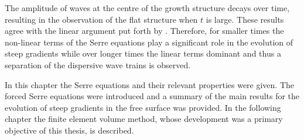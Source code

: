 The amplitude of waves at the centre of the growth structure decays over time, resulting in the observation of the flat structure when $t$ is large. These results agree with the linear argument put forth by \citet{Dougalis-etal-2007}. Therefore, for smaller times the non-linear terms of the Serre equations play a significant role in the evolution of steep gradients while over longer times the linear terms dominant and thus a separation of the dispersive wave trains is observed. 

\medskip

In this chapter the Serre equations and their relevant properties were given. The forced Serre equations were introduced and a summary of the main results for the evolution of steep gradients in the free surface was provided. In the following chapter the finite element volume method, whose development was a primary objective of this thesis, is described. 
